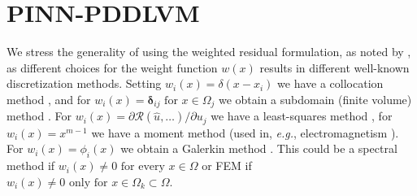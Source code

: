 \documentclass[11pt, fleqn]{article}
\def\cR{{\mathcal R}}
\def\cR{{\mathcal R}}
\begin{document}
\section{{PINN}-{PDDLVM}}\label{sec:AppendixPINNPDDLVM}
%
We stress the generality of using the weighted residual formulation, as noted by \cite{rixner2021probabilistic}, as different choices for the weight function $w(x)$ results in different well-known discretization methods. Setting
 $w_i(x) = \delta(x - x_i)$ we have a collocation method  \cite{strikwerda2004finite}, and for $w_i(x) = \boldsymbol{\delta}_{ij}  \text{ for }  x \in \Omega_j$ we obtain a subdomain (finite volume) method \cite{eymard2000finite}. For $w_i(x) = {\partial \cR(\hat{u}, \hdots)}/{\partial u_j}$ we have a least-squares method \cite{finlayson1966method}, for $w_i(x) = x^{m-1}$ we have a moment method (used in, \emph{e.g.}, electromagnetism \cite{gibson2021method}). For  $w_i(x) = \phi_i(x)$ we obtain a Galerkin method \cite{ern2004theory}. This could be a spectral method if $w_i(x) \neq 0 \text{ for every } x \in \Omega$ or \gls*{FEM} if $w_i(x) \neq 0 \text{ only for } x \in \Omega_k \subset \Omega$. 
\end{document}
